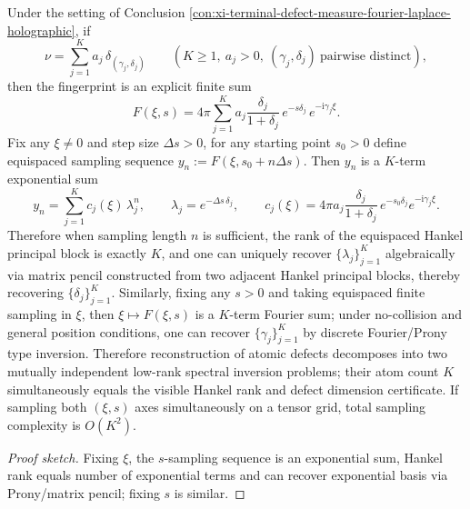 \begin{conclusion}\label{con:xi-terminal-atomic-defect-hankel-prony}
Under the setting of Conclusion \ref{con:xi-terminal-defect-measure-fourier-laplace-holographic}, if
\[
\nu=\sum_{j=1}^{K}a_j\,\delta_{(\gamma_j,\delta_j)}
\qquad(K\ge 1,\ a_j>0,\ (\gamma_j,\delta_j)\ \text{pairwise distinct}),
\]
then the fingerprint is an explicit finite sum
\[
F(\xi,s)=4\pi\sum_{j=1}^{K}a_j\frac{\delta_j}{1+\delta_j}\,e^{-s\delta_j}\,e^{-\mathrm{i}\gamma_j\xi}.
\]
Fix any \(\xi\neq 0\) and step size \(\Delta s>0\), for any starting point \(s_0>0\) define equispaced sampling sequence
\(
y_n:=F(\xi,s_0+n\Delta s)
\).
Then \(y_n\) is a \(K\)-term exponential sum
\[
y_n=\sum_{j=1}^{K}c_j(\xi)\,\lambda_j^{n},
\qquad
\lambda_j=e^{-\Delta s\,\delta_j},
\qquad
c_j(\xi)=4\pi a_j\frac{\delta_j}{1+\delta_j}\,e^{-s_0\delta_j}e^{-\mathrm{i}\gamma_j\xi}.
\]
Therefore when sampling length \(n\) is sufficient, the rank of the equispaced Hankel principal block is exactly \(K\), and one can uniquely recover \(\{\lambda_j\}_{j=1}^{K}\) algebraically via matrix pencil constructed from two adjacent Hankel principal blocks, thereby recovering \(\{\delta_j\}_{j=1}^{K}\).
Similarly, fixing any \(s>0\) and taking equispaced finite sampling in \(\xi\), then \(\xi\mapsto F(\xi,s)\) is a \(K\)-term Fourier sum;
under no-collision and general position conditions, one can recover \(\{\gamma_j\}_{j=1}^{K}\) by discrete Fourier/Prony type inversion.
Therefore reconstruction of atomic defects decomposes into two mutually independent low-rank spectral inversion problems; their atom count \(K\) simultaneously equals the visible Hankel rank and defect dimension certificate.
If sampling both \((\xi,s)\) axes simultaneously on a tensor grid, total sampling complexity is \(O(K^2)\).
\end{conclusion}
\begin{proof}[Proof sketch]
Fixing \(\xi\), the \(s\)-sampling sequence is an exponential sum, Hankel rank equals number of exponential terms and can recover exponential basis via Prony/matrix pencil;
fixing \(s\) is similar.
\end{proof}


